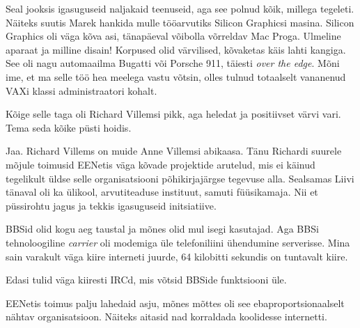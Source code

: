Seal jooksis igasuguseid naljakaid teenuseid, aga see polnud kõik, millega tegeleti. 
Näiteks suutis Marek hankida mulle tööarvutiks Silicon 
Graphicsi masina. Silicon Graphics oli väga kõva asi, tänapäeval 
võibolla võrreldav Mac Proga. Ulmeline aparaat ja milline disain! 
Korpused olid värvilised, kõvaketas 
käis lahti kangiga. See oli nagu automaailma 
Bugatti või Porsche 911, täiesti \emph{over the 
edge}. Mõni ime, et ma selle töö hea meelega vastu võtsin, olles tulnud 
totaalselt vananenud VAXi klassi administraatori kohalt.

Kõige selle taga oli Richard Villemsi pikk, aga heledat ja positiivset 
värvi vari. Tema seda kõike püsti hoidis.


Jaa. Richard Villems on muide Anne Villemsi abikaasa. 
Tänu Richardi suurele 
mõjule toimusid EENetis väga kõvade projektide arutelud, 
mis ei käinud tegelikult üldse selle organisatsiooni põhikirjajärgse tegevuse alla. 
Sealsamas Liivi tänaval oli ka ülikool, arvutiteaduse 
instituut, samuti füüsikamaja. Nii et püssirohtu jagus ja 
tekkis igasuguseid initsiatiive.


BBSid olid kogu aeg taustal ja mõnes olid mul isegi kasutajad. Aga BBSi tehnoloogiline \emph{carrier} oli modemiga üle
telefoniliini ühendumine serverisse. Mina sain varakult väga kiire 
interneti juurde, 64 kilobitti sekundis on tuntavalt kiire. 

Edasi tulid väga kiiresti IRCd, mis võtsid BBSide funktsiooni üle. 

EENetis toimus palju lahedaid asju, mõnes mõttes oli see 
ebaproportsionaalselt nähtav organisatsioon. Näiteks aitasid
nad korraldada koolidesse internetti.

